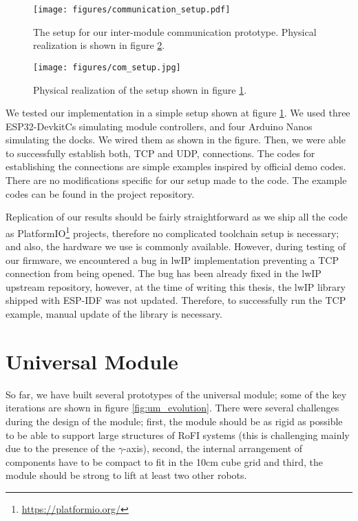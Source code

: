 \begin{figure}[!t]
    \centering
    \texttt{[image: figures/communication\_setup.pdf]}
    \caption{The setup for our inter-module communication prototype. Physical
    realization is shown in figure \ref{fig:comm_setup_p}.}
    \label{fig:comm_setup}
\end{figure}

\begin{figure}[!t]
    \centering
    \texttt{[image: figures/com\_setup.jpg]}
    \caption{Physical realization of the setup shown in figure \ref{fig:comm_setup}.}
    \label{fig:comm_setup_p}
\end{figure}

We tested our implementation in a simple setup shown at figure
\ref{fig:comm_setup}. We used three ESP32-DevkitCs simulating module
controllers, and four Arduino Nanos simulating the docks. We wired them as shown
in the figure. Then, we were able to successfully establish both, TCP and UDP,
connections. The codes for establishing the connections are simple examples
inspired by official demo codes. There are no modifications specific for our
setup made to the code. The example codes can be found in the project
repository.

Replication of our results should be fairly straightforward as we ship all the
code as PlatformIO\footnote{\url{https://platformio.org/}} projects, therefore
no complicated toolchain setup is necessary; and also, the hardware we use is
commonly available. However, during testing of our firmware, we encountered a
bug in lwIP implementation preventing a TCP connection from being opened. The
bug has been already fixed in the lwIP upstream repository, however, at the time
of writing this thesis, the lwIP library shipped with ESP-IDF was not updated.
Therefore, to successfully run the TCP example, manual update of the library is
necessary.

\section{Universal Module}

So far, we have built several prototypes of the universal module; some of the
key iterations are shown in figure \ref{fig:um_evolution}. There were several
challenges during the design of the module; first, the module should be as rigid
as possible to be able to support large structures of RoFI systems (this is
challenging mainly due to the presence of the $\gamma$-axis), second, the
internal arrangement of components have to be compact to fit in the 10cm cube
grid and third, the module should be strong to lift at least two other robots.

